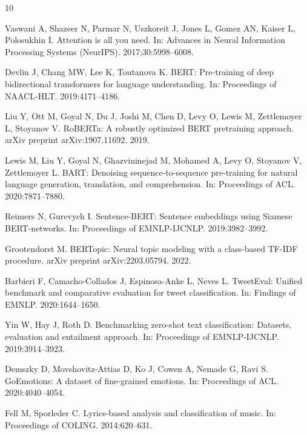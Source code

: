 \documentclass[pdflatex,sn-mathphys-num]{sn-jnl}
\begin{document}
\begin{thebibliography}{10}

Vaswani A, Shazeer N, Parmar N, Uszkoreit J, Jones L, Gomez AN, Kaiser L, Polosukhin I.
Attention is all you need.
In: Advances in Neural Information Processing Systems (NeurIPS). 2017;30:5998--6008.

Devlin J, Chang MW, Lee K, Toutanova K.
BERT: Pre-training of deep bidirectional transformers for language understanding.
In: Proceedings of NAACL-HLT. 2019:4171--4186.

Liu Y, Ott M, Goyal N, Du J, Joshi M, Chen D, Levy O, Lewis M, Zettlemoyer L, Stoyanov V.
RoBERTa: A robustly optimized BERT pretraining approach.
arXiv preprint arXiv:1907.11692. 2019.

Lewis M, Liu Y, Goyal N, Ghazvininejad M, Mohamed A, Levy O, Stoyanov V, Zettlemoyer L.
BART: Denoising sequence-to-sequence pre-training for natural language generation, translation, and comprehension.
In: Proceedings of ACL. 2020:7871--7880.

Reimers N, Gurevych I.
Sentence-BERT: Sentence embeddings using Siamese BERT-networks.
In: Proceedings of EMNLP-IJCNLP. 2019:3982--3992.

Grootendorst M.
BERTopic: Neural topic modeling with a class-based TF-IDF procedure.
arXiv preprint arXiv:2203.05794. 2022.

Barbieri F, Camacho-Collados J, Espinosa-Anke L, Neves L.
TweetEval: Unified benchmark and comparative evaluation for tweet classification.
In: Findings of EMNLP. 2020:1644--1650.

Yin W, Hay J, Roth D.
Benchmarking zero-shot text classification: Datasets, evaluation and entailment approach.
In: Proceedings of EMNLP-IJCNLP. 2019:3914--3923.

Demszky D, Movshovitz-Attias D, Ko J, Cowen A, Nemade G, Ravi S.
GoEmotions: A dataset of fine-grained emotions.
In: Proceedings of ACL. 2020:4040--4054.

Fell M, Sporleder C.
Lyrics-based analysis and classification of music.
In: Proceedings of COLING. 2014:620--631.

\end{thebibliography}
\end{document}
